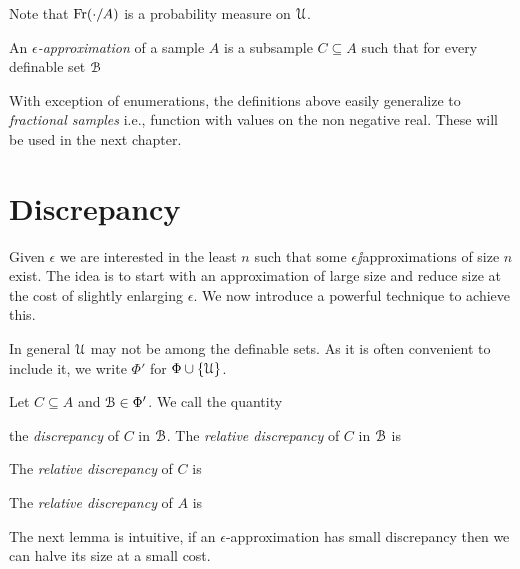 \documentclass[sputnik.tex]{subfiles}
\begin{document}
Note that $\mathop{\rm Fr}(\cdot/A)$ is a probability measure on $\EuScript U$.

An \emph{$\epsilon$-approximation\/} of a sample $A$ is a subsample $C\subseteq A$ such that for every definable set $\EuScript B$


With exception of enumerations, the definitions above easily generalize to \emph{fractional samples\/} i.e.,  function with values on the non negative real.
These will be used in the next chapter.

\section{Discrepancy}\label{epsilon_approximations}

Given $\epsilon$ we are interested in the least $n$ such that some $\epsilon\jj$approximations of size $n$ exist.
The idea is to start with an approximation of large size and reduce size at the cost of slightly enlarging $\epsilon$.
We now introduce a powerful technique to achieve this.

In general $\EuScript U$ may not be among the definable sets. As it is often convenient to include it, we write \emph{$\Phi'$\/} for $\Phi\cup\{\EuScript U\}$.

Let $C\subseteq A$ and $\EuScript B\in\Phi'$. We call the quantity 


the \emph{discrepancy\/} of $C$ in $\EuScript B$. The \emph{relative discrepancy\/} of $C$ in $\EuScript B$ is


The \emph{relative discrepancy\/} of $C$ is\smallskip


The \emph{relative discrepancy\/} of $A$ is 


The next lemma is intuitive, if an $\epsilon$-approximation has small discrepancy then we can halve its size at a small cost.
\end{document}
